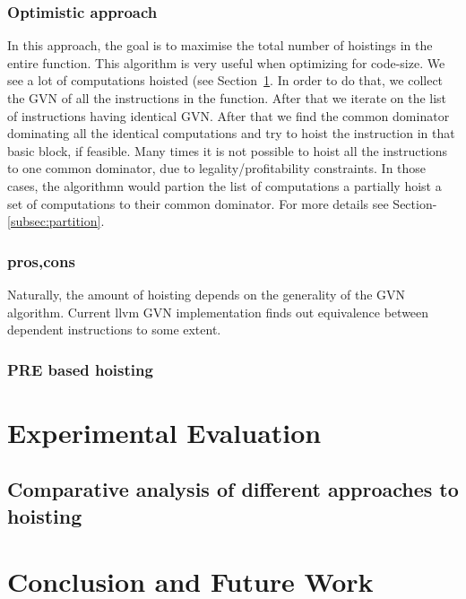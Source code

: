 \documentclass{sig-alternate}
\begin{document}
\subsubsection{Optimistic approach}
In this approach, the goal is to maximise the total number of hoistings in the
entire function.  This algorithm is very useful when optimizing for code-size.
We see a lot of computations hoisted (see
Section~\ref{sec:experimental-results}. In order to do that, we collect the GVN
of all the instructions in the function. After that we iterate on the list of
instructions having identical GVN. After that we find the common dominator
dominating all the identical computations and try to hoist the instruction in
that basic block, if feasible. Many times it is not possible to hoist all the
instructions to one common dominator, due to legality/profitability
constraints. In those cases, the algorithmn would partion the list of
computations a partially hoist a set of computations to their common
dominator. For more details see Section-\ref{subsec:partition}.


\subsubsection{pros,cons}
Naturally, the amount of hoisting depends on the generality of the GVN
algorithm. Current llvm GVN implementation finds out equivalence between
dependent instructions to some extent.

\subsubsection{PRE based hoisting}

\newpage

\section{Experimental Evaluation}
\label{sec:experimental-results}

\subsection{Comparative analysis of different approaches to hoisting}


\section{Conclusion and Future Work}


{\small

}
\end{document}
